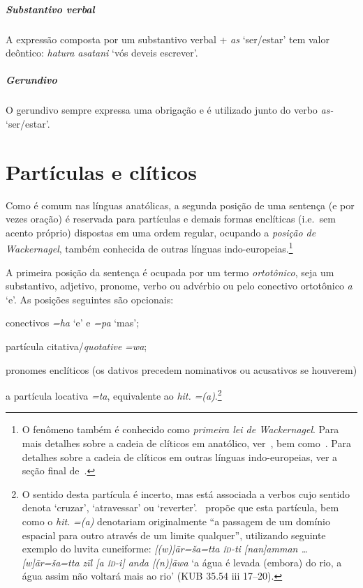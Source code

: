 \paragraph{Substantivo verbal}
A expressão composta por um substantivo verbal + \emph{as} `ser\slash{}estar' tem valor
deôntico: \emph{hatura asatani} `vós deveis escrever'.

\paragraph{Gerundivo}
O gerundivo sempre expressa uma obrigação e é utilizado junto do verbo \emph{as-} `ser\slash{}estar'.


\chapter{Partículas e clíticos}

Como é comum nas línguas anatólicas, a segunda posição de uma sentença (e por
vezes oração) é reservada para partículas e demais formas enclíticas  (i.e.\ sem
acento próprio) dispostas em uma ordem regular, ocupando a \emph{posição de Wackernagel}, também conhecida de
outras línguas indo-europeias.\footnote{O fenômeno também é conhecido como
	\emph{primeira lei de Wackernagel}. Para mais detalhes sobre a cadeia de
	clíticos em anatólico, ver~, bem
	como~\citet{Garret1989,Garret1990,AgbayaniGolston2012}.
	Para detalhes sobre a cadeia de clíticos em outras línguas indo-europeias,
	ver a seção final de~\citet{WackernagelsLawI}.
}

A primeira posição da sentença é ocupada por um termo \emph{ortotônico},
seja um substantivo, adjetivo, pronome, verbo ou advérbio ou pelo conectivo
ortotônico \emph{a} `e'.
As posições seguintes são opcionais:
\begin{inparaenum}
	\item[2.] conectivos \emph{=ha} `e' e \emph{=pa} `mas';
	\item[3.] partícula citativa\slash{}\emph{quotative} \emph{=wa};
	\item[4.] pronomes enclíticos (os dativos precedem nominativos ou acusativos
	se houverem)
	\item[5.] a partícula locativa \emph{=ta}, equivalente ao \emph{hit.}
	\emph{={(a)}}.\footnote{O sentido desta partícula é
	incerto, mas está associada a verbos cujo sentido denota `cruzar',
	`atravessar' ou `reverter'.~\citet[419]{Josephson1972} propõe que esta partícula,
	bem como o \emph{hit.} \emph{={(a)}} denotariam originalmente
	``a passagem de um domínio espacial para outro através de um limite
	qualquer'', utilizando seguinte exemplo do luvita cuneiforme:
	\emph{[(w)]ār=ša=tta \textsc{íd}-ti [nan]amman \ldots{} [w]ār=ša=tta zīl [a
	\textsc{íd}-i] anda [(n)]āwa} `a água é levada (embora) do rio, a água assim
	não voltará mais ao rio' (KUB 35.54 iii 17–20).
	}
\end{inparaenum}

